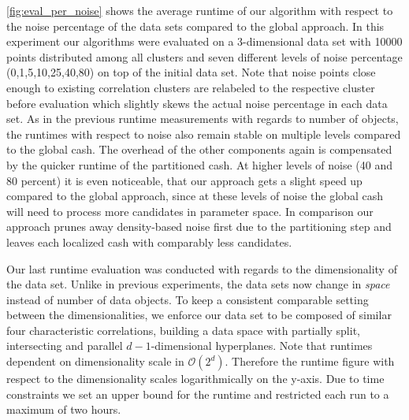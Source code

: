 \autoref{fig:eval_per_noise} shows the average runtime of our algorithm with respect to the noise percentage of the data sets compared to the global approach. In this experiment our algorithms were evaluated on a 3-dimensional data set with 10000 points distributed among all clusters and seven different levels of noise percentage (0,1,5,10,25,40,80) on top of the initial data set. Note that noise points close enough to existing correlation clusters are relabeled to the respective cluster before evaluation which slightly skews the actual noise percentage in each data set.
As in the previous runtime measurements with regards to number of objects, the runtimes with respect to noise also remain stable on multiple levels compared to the global \gls{cash}. The overhead of the other components again is compensated by the quicker runtime of the partitioned \gls{cash}. At higher levels of noise (40 and 80 percent) it is even noticeable, that our approach gets a slight speed up compared to the global approach, since at these levels of noise the global cash will need to process more candidates in parameter space. In comparison our approach prunes away density-based noise first due to the partitioning step and leaves each localized \gls{cash} with comparably less candidates.

Our last runtime evaluation was conducted with regards to the dimensionality of the data set. Unlike in previous experiments, the data sets now change in \textit{space} instead of number of data objects. To keep a consistent comparable setting between the dimensionalities, we enforce our data set to be composed of similar four characteristic correlations, building a data space with partially split, intersecting and parallel $d-1$-dimensional hyperplanes. 
Note that runtimes dependent on dimensionality scale in $\mathcal{O}(2^d)$. Therefore the runtime figure with respect to the dimensionality scales logarithmically on the y-axis. Due to time constraints we set an upper bound for the runtime and restricted each run to a maximum of two hours. 

